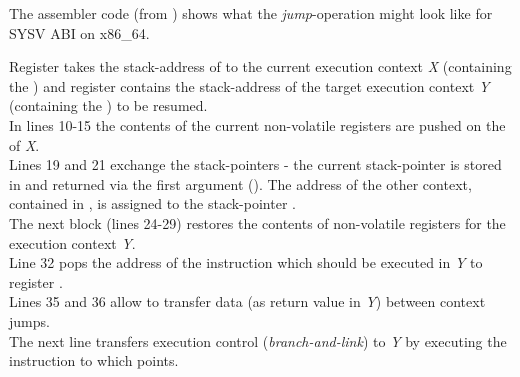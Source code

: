 \label{appendix}

The assembler code (from \boostcontext) shows what the \textit{jump}-operation
might look like for SYSV ABI on x86\_64.

Register  takes the stack-address of to the current execution context
\textit{X} (containing the \cblock) and register  contains the
stack-address of the target execution context \textit{Y} (containing the
\cblock) to be resumed.\\
\newline
In lines 10-15 the contents of the current non-volatile registers are pushed on
the \stack of \textit{X}.\\
\newline
Lines 19 and 21 exchange the stack-pointers - the current stack-pointer is
stored in and returned via the first argument (). The address of the
other context, contained in , is assigned to the stack-pointer
.\\
\newline
The next block (lines 24-29) restores the contents of non-volatile registers for
the execution context \textit{Y}.\\
\newline
Line 32 pops the address of the instruction which should be executed in
\textit{Y} to register .\\
\newline
Lines 35 and 36 allow to transfer data (as return value in \textit{Y}) between
context jumps.\\
\newline
The next line transfers execution control (\textit{branch-and-link}) to
\textit{Y} by executing the instruction to which  points.
